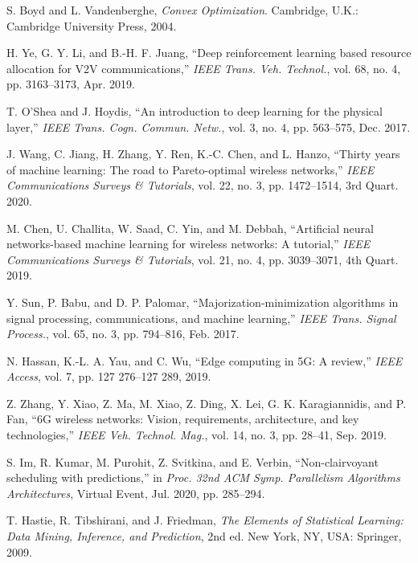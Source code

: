 \documentclass[conference]{IEEEtran}
\begin{document}
\begin{thebibliography}{20}
 S. Boyd and L. Vandenberghe, \textit{Convex Optimization}. Cambridge, U.K.: Cambridge University Press, 2004.

 H. Ye, G. Y. Li, and B.-H. F. Juang, ``Deep reinforcement learning based resource allocation for V2V communications,'' \textit{IEEE Trans. Veh. Technol.}, vol. 68, no. 4, pp. 3163--3173, Apr. 2019.

 T. O'Shea and J. Hoydis, ``An introduction to deep learning for the physical layer,'' \textit{IEEE Trans. Cogn. Commun. Netw.}, vol. 3, no. 4, pp. 563--575, Dec. 2017.

 J. Wang, C. Jiang, H. Zhang, Y. Ren, K.-C. Chen, and L. Hanzo, ``Thirty years of machine learning: The road to Pareto-optimal wireless networks,'' \textit{IEEE Communications Surveys \& Tutorials}, vol. 22, no. 3, pp. 1472--1514, 3rd Quart. 2020.

 M. Chen, U. Challita, W. Saad, C. Yin, and M. Debbah, ``Artificial neural networks-based machine learning for wireless networks: A tutorial,'' \textit{IEEE Communications Surveys \& Tutorials}, vol. 21, no. 4, pp. 3039--3071, 4th Quart. 2019.

 Y. Sun, P. Babu, and D. P. Palomar, ``Majorization-minimization algorithms in signal processing, communications, and machine learning,'' \textit{IEEE Trans. Signal Process.}, vol. 65, no. 3, pp. 794--816, Feb. 2017.

 N. Hassan, K.-L. A. Yau, and C. Wu, ``Edge computing in 5G: A review,'' \textit{IEEE Access}, vol. 7, pp. 127 276--127 289, 2019.

 Z. Zhang, Y. Xiao, Z. Ma, M. Xiao, Z. Ding, X. Lei, G. K. Karagiannidis, and P. Fan, ``6G wireless networks: Vision, requirements, architecture, and key technologies,'' \textit{IEEE Veh. Technol. Mag.}, vol. 14, no. 3, pp. 28--41, Sep. 2019.

 S. Im, R. Kumar, M. Purohit, Z. Svitkina, and E. Verbin, ``Non-clairvoyant scheduling with predictions,'' in \textit{Proc. 32nd ACM Symp. Parallelism Algorithms Architectures}, Virtual Event, Jul. 2020, pp. 285--294.

 T. Hastie, R. Tibshirani, and J. Friedman, \textit{The Elements of Statistical Learning: Data Mining, Inference, and Prediction}, 2nd ed. New York, NY, USA: Springer, 2009.


\end{thebibliography}
\end{document}

